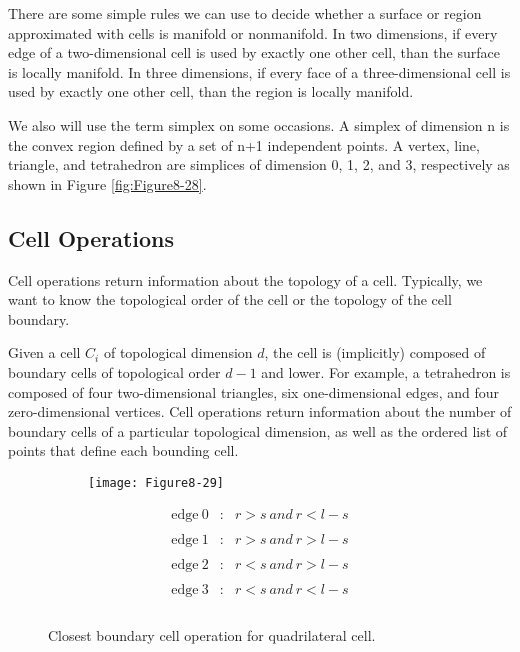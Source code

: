 There are some simple rules we can use to decide whether a surface or region approximated with cells is manifold or nonmanifold. In two dimensions, if every edge of a two-dimensional cell is used by exactly one other cell, than the surface is locally manifold. In three dimensions, if every face of a three-dimensional cell is used by exactly one other cell, than the region is locally manifold.

We also will use the term simplex on some occasions. A simplex of dimension n is the convex region defined by a set of n+1 independent points. A vertex, line, triangle, and tetrahedron are simplices of dimension 0, 1, 2, and 3, respectively as shown in Figure \ref{fig:Figure8-28}.

\subsection{Cell Operations}

Cell operations return information about the topology of a cell. Typically, we want to know the topological order of the cell or the topology of the cell boundary.

Given a cell $C_i$ of topological dimension $d$, the cell is (implicitly) composed of boundary cells of topological order $d-1$ and lower. For example, a tetrahedron is composed of four two-dimensional triangles, six one-dimensional edges, and four zero-dimensional vertices. Cell operations return information about the number of boundary cells of a particular topological dimension, as well as the ordered list of points that define each bounding cell.

\begin{figure}[!htb]
    \centering
    \begin{subfigure}{0.48\linewidth}
        \centering
        \texttt{[image: Figure8-29]}
        \caption*{}\label{fig:Figure8-29a}
    \end{subfigure}
    \hfill
    \begin{subfigure}{0.48\linewidth}
    \begin{equation*}
        \begin{array}{lll}
        \text{edge}\: 0 &:& r > s\: and\: r < l - s \\ \\
        \text{edge}\: 1 &:& r > s\: and\: r > l - s \\ \\
        \text{edge}\: 2 &:& r < s\: and\: r > l - s \\ \\
        \text{edge}\: 3 &:& r < s\: and\: r < l - s \\ \\
    \end{array}
    \end{equation*}
    \end{subfigure}%
    \caption{Closest boundary cell operation for quadrilateral cell.}
    \label{fig:Figure8-29}
\end{figure}


